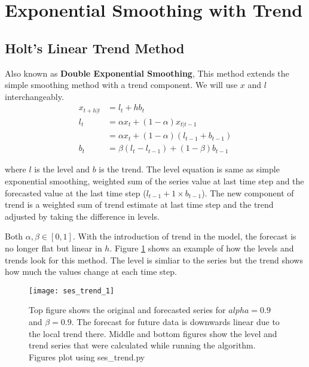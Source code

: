 \documentclass[../../time_series_notes.tex]{subfiles}
\begin{document}
\section{Exponential Smoothing with Trend}
\subsection{Holt's Linear Trend Method}
Also known as \textbf{Double Exponential Smoothing}, This method extends the simple smoothing method with a trend component. We will use $x$ and $l$ interchangeably.
\begin{align*}
    x_{t+h|t} &= l_{t} + hb_{t}\\
    l_{t} &= \alpha x_{t} + (1-\alpha)x_{t|t-1}\\
    &= \alpha x_{t} + (1-\alpha)(l_{t-1} + b_{t-1})\\
    b_{t} &= \beta(l_{t} - l_{t-1}) + (1-\beta)b_{t-1}
\end{align*}

where $l$ is the level and $b$ is the trend. The level equation is same as simple exponential smoothing, weighted sum of the series value at last time step and the forecasted value at the last time step ($l_{t-1} + 1 \times b_{t-1}$). The new component of trend is a weighted sum of trend estimate at last time step and the trend adjusted by taking the difference in levels.\newline

Both $\alpha, \beta \in [0,1]$. With the introduction of trend in the model, the forecast is no longer flat but linear in $h$. Figure \ref{fig:ses_trend_1} shows an example of how the levels and trends look for this method. The level is simliar to the series but the trend shows how much the values change at each time step.

\begin{figure}[h]
    \texttt{[image: ses\_trend\_1]}
    \centering
    \caption {Top figure shows the original and forecasted series for $alpha=0.9$ and $\beta=0.9$. The forecast for future data is downwards linear due to the local trend there. Middle and bottom figures show the level and trend series that were calculated while running the algorithm. Figures plot using ses\_trend.py}
    \label{fig:ses_trend_1} %
\end{figure}
\end{document}

